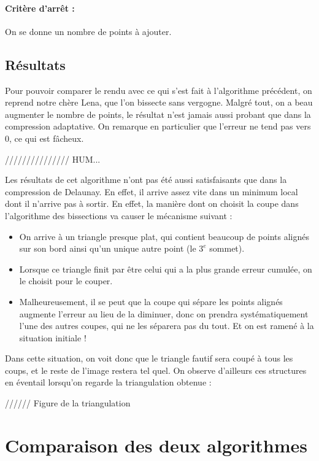 \documentclass{report}
\begin{document}
\paragraph{Critère d'arrêt :}
On se donne un nombre de points à ajouter.

\subsection{Résultats}

Pour pouvoir comparer le rendu avec ce qui s'est fait à l'algorithme précédent, on reprend notre chère Lena, que l'on bissecte sans vergogne. Malgré tout, on a beau augmenter le nombre de points, le résultat n'est jamais aussi probant que dans la compression adaptative. On remarque en particulier que l'erreur ne tend pas vers 0, ce qui est fâcheux.

/////////////// HUM...


Les résultats de cet algorithme n'ont pas été aussi satisfaisants que dans la compression de Delaunay. En effet, il arrive assez vite dans un minimum local dont il n'arrive pas à sortir. En effet, la manière dont on choisit la coupe dans l'algorithme des bissections va causer le mécanisme suivant :
\begin{itemize}
	\item On arrive à un triangle presque plat, qui contient beaucoup de points alignés sur son bord ainsi qu'un unique autre point (le $3^e$ sommet).
	\item Lorsque ce triangle finit par être celui qui a la plus grande erreur cumulée, on le choisit pour le couper.
	\item Malheureusement, il se peut que la coupe qui sépare les points alignés augmente l'erreur au lieu de la diminuer, donc on prendra systématiquement l'une des autres coupes, qui ne les séparera pas du tout. Et on est ramené à la situation initiale !
\end{itemize}

Dans cette situation, on voit donc que le triangle fautif sera coupé à tous les coups, et le reste de l'image restera tel quel. On observe d'ailleurs ces structures en éventail lorsqu'on regarde la triangulation obtenue :

//////
Figure de la triangulation


\section{Comparaison des deux algorithmes}
\end{document}
